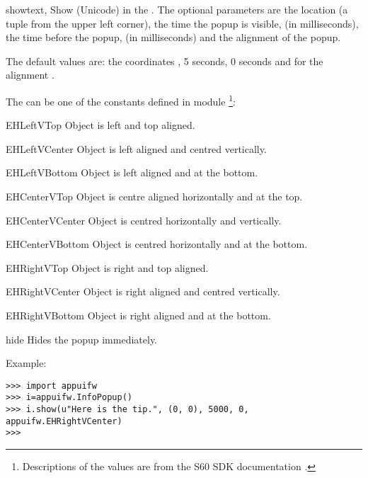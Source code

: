 \begin{methoddesc}[InfoPopup]{show}{text, }
Show  (Unicode) in the . The optional parameters are 
the location (a tuple from the upper left corner), the time the popup is 
visible,  (in milliseconds), the time before the popup, 
 (in milliseconds) and the alignment of the popup.

The default values are: the coordinates ,  5 
seconds,  0 seconds and for the alignment 
.

The  can be one of the constants defined in module 
\footnote{Descriptions of the values are from the S60 SDK 
documentation \cite{S60Doc}.}:

\begin{datadesc}{EHLeftVTop} 
Object is left and top aligned. 
\end{datadesc}

\begin{datadesc}{EHLeftVCenter} 
Object is left aligned and centred vertically. 
\end{datadesc}

\begin{datadesc}{EHLeftVBottom} 
Object is left aligned and at the bottom. 
\end{datadesc}

\begin{datadesc}{EHCenterVTop} 
Object is centre aligned horizontally and at the top. 
\end{datadesc}

\begin{datadesc}{EHCenterVCenter} 
Object is centred horizontally and vertically. 
\end{datadesc}

\begin{datadesc}{EHCenterVBottom} 
Object is centred horizontally and at the bottom. 
\end{datadesc}

\begin{datadesc}{EHRightVTop} 
Object is right and top aligned. 
\end{datadesc}
 
\begin{datadesc}{EHRightVCenter} 
Object is right aligned and centred vertically. 
\end{datadesc}

\begin{datadesc}{EHRightVBottom} 
Object is right aligned and at the bottom. 
\end{datadesc}

\end{methoddesc}

\begin{methoddesc}[InfoPopup]{hide}{}
Hides the popup immediately.
\end{methoddesc}

Example:

\begin{verbatim}
>>> import appuifw
>>> i=appuifw.InfoPopup()
>>> i.show(u"Here is the tip.", (0, 0), 5000, 0, appuifw.EHRightVCenter)
>>>
\end{verbatim}
